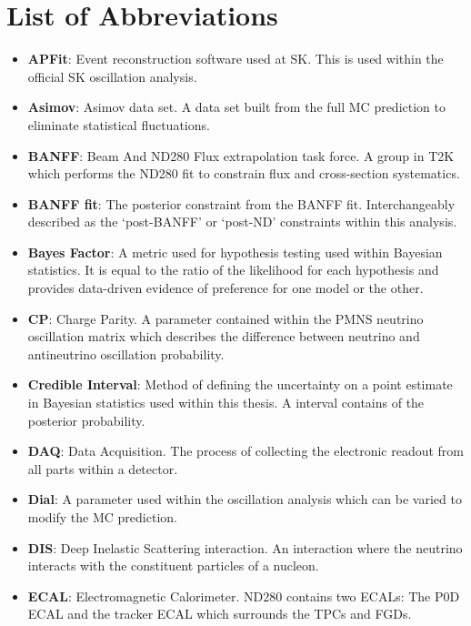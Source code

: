\chapter*{List of Abbreviations}

\begin{itemize}[label={},leftmargin=*]
  
\item \textbf{APFit}: Event reconstruction software used at SK. This is used within the official SK oscillation analysis.
\item \textbf{Asimov}: Asimov data set. A data set built from the full MC prediction to eliminate statistical fluctuations.
\item \textbf{BANFF}: Beam And ND280 Flux extrapolation task force. A group in T2K which performs the ND280 fit to constrain flux and cross-section systematics. 
\item \textbf{BANFF fit}: The posterior constraint from the BANFF fit. Interchangeably described as the `post-BANFF' or `post-ND' constraints within this analysis.
\item \textbf{Bayes Factor}: A metric used for hypothesis testing used within Bayesian statistics. It is equal to the ratio of the likelihood for each hypothesis and provides data-driven evidence of preference for one model or the other.
\item \textbf{CP}: Charge Parity. A parameter contained within the PMNS neutrino oscillation matrix which describes the difference between neutrino and antineutrino oscillation probability.
\item \textbf{Credible Interval}: Method of defining the uncertainty on a point estimate in Bayesian statistics used within this thesis. A  interval contains  of the posterior probability.
\item \textbf{DAQ}: Data Acquisition. The process of collecting the electronic readout from all parts within a detector.
\item \textbf{Dial}: A parameter used within the oscillation analysis which can be varied to modify the MC prediction.
\item \textbf{DIS}: Deep Inelastic Scattering interaction. An interaction where the neutrino interacts with the constituent particles of a nucleon.
\item \textbf{ECAL}: Electromagnetic Calorimeter. ND280 contains two ECALs: The P0D ECAL and the tracker ECAL which surrounds the TPCs and FGDs.

\end{itemize}
